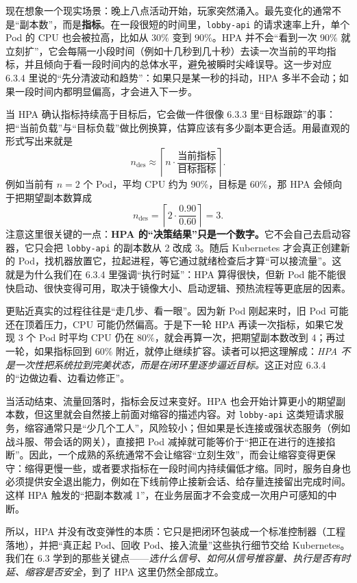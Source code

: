 现在想象一个现实场景：晚上八点活动开始，玩家突然涌入。最先变化的通常不是“副本数”，而是\textbf{指标}。在一段很短的时间里，\texttt{lobby-api} 的请求速率上升，单个 Pod 的 CPU 也会被拉高，比如从 $30\%$ 变到 $90\%$。HPA 并不会“看到一次 $90\%$ 就立刻扩”，它会每隔一小段时间（例如十几秒到几十秒）去读一次当前的平均指标，并且倾向于看一段时间内的总体水平，避免被瞬时尖峰误导。这一步对应 6.3.4 里说的“先分清波动和趋势”：如果只是某一秒的抖动，HPA 多半不会动；如果一段时间内都明显偏高，才会进入下一步。

当 HPA 确认指标持续高于目标后，它会做一件很像 6.3.3 里“目标跟踪”的事：把“当前负载”与“目标负载”做比例换算，估算应该有多少副本更合适。用最直观的形式写出来就是
\[
n_{\mathrm{des}} \approx \left\lceil n \cdot \frac{\text{当前指标}}{\text{目标指标}}\right\rceil.
\]
例如当前有 $n=2$ 个 Pod，平均 CPU 约为 $90\%$，目标是 $60\%$，那 HPA 会倾向于把期望副本数算成
\[
n_{\mathrm{des}}=\left\lceil 2 \cdot \frac{0.90}{0.60}\right\rceil = 3.
\]
注意这里很关键的一点：\textbf{HPA 的“决策结果”只是一个数字。}它不会自己去启动容器，它只会把 \texttt{lobby-api} 的副本数从 2 改成 3。随后 Kubernetes 才会真正创建新的 Pod，找机器放置它，拉起进程，等它通过就绪检查后才算“可以接流量”。这就是为什么我们在 6.3.4 里强调“执行时延”：HPA 算得很快，但新 Pod 能不能很快启动、很快变得可用，取决于镜像大小、启动逻辑、预热流程等更底层的因素。

更贴近真实的过程往往是“走几步、看一眼”。因为新 Pod 刚起来时，旧 Pod 可能还在顶着压力，CPU 可能仍然偏高。于是下一轮 HPA 再读一次指标，如果它发现 3 个 Pod 时平均 CPU 仍在 $80\%$，就会再算一次，把期望副本数改到 4；再过一轮，如果指标回到 $60\%$ 附近，就停止继续扩容。读者可以把这理解成：\emph{HPA 不是一次性把系统拉到完美状态，而是在闭环里逐步逼近目标。}这正对应 6.3.4 的“边做边看、边看边修正”。

当活动结束、流量回落时，指标会反过来变好。HPA 也会开始计算更小的期望副本数，但这里就会自然接上前面对缩容的描述内容。对 \texttt{lobby-api} 这类短请求服务，缩容通常只是“少几个工人”，风险较小；但如果是长连接或强状态服务（例如战斗服、带会话的网关），直接把 Pod 减掉就可能等价于“把正在进行的连接掐断”。因此，一个成熟的系统通常不会让缩容“立刻生效”，而会让缩容变得更保守：缩得更慢一些，或者要求指标在一段时间内持续偏低才缩。同时，服务自身也必须提供安全退出能力，例如在下线前停止接新会话、给存量连接留出完成时间。这样 HPA 触发的“把副本数减 1”，在业务层面才不会变成一次用户可感知的中断。

所以，HPA 并没有改变弹性的本质：它只是把闭环包装成一个标准控制器（工程落地），并把“真正起 Pod、回收 Pod、接入流量”这些执行细节交给 Kubernetes。我们在 6.3 学到的那些关键点——\emph{选什么信号、如何从信号推容量、执行是否有时延、缩容是否安全}，到了 HPA 这里仍然全部成立。

